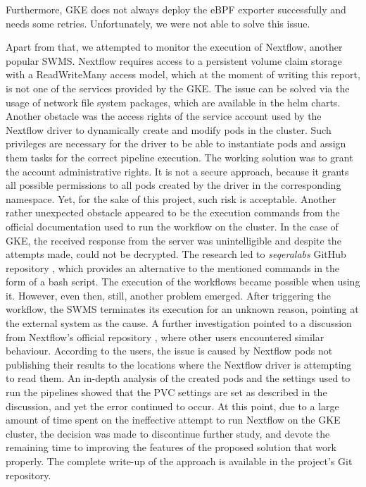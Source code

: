 \documentclass[a4paper,journal]{IEEEtran}
\begin{document}
Furthermore, GKE does not always deploy the eBPF exporter successfully and needs some retries. Unfortunately, we were not able to solve this issue.

Apart from that, we attempted to monitor the execution of Nextflow, another popular SWMS. Nextflow requires access to a persistent volume claim storage with a ReadWriteMany access model, which at the moment of writing this report, is not one of the services provided by the GKE. The issue can be solved via the usage of network file system packages, which are available in the helm charts. Another obstacle was the access rights of the service account used by the Nextflow driver to dynamically create and modify pods in the cluster. Such privileges are necessary for the driver to be able to instantiate pods and assign them tasks for the correct pipeline execution. The working solution was to grant the account administrative rights. It is not a secure approach, because it grants all possible permissions to all pods created by the driver in the corresponding namespace. Yet, for the sake of this project, such risk is acceptable. Another rather unexpected obstacle appeared to be the execution commands from the official documentation \cite{nextflowK8SDoku} used to run the workflow on the cluster. In the case of GKE, the received response from the server was unintelligible and despite the attempts made, could not be decrypted. The research led to \textit{seqeralabs} GitHub repository \cite{nextflowBestPractices}, which provides an alternative to the mentioned commands in the form of a bash script. The execution of the workflows became possible when using it. However, even then, still, another problem emerged. After triggering the workflow, the SWMS terminates its execution for an unknown reason, pointing at the external system as the cause. A further investigation pointed to a discussion from Nextflow's official repository \cite{nextflowGitDiscussion}, where other users encountered similar behaviour. According to the users, the issue is caused by Nextflow pods not publishing their results to the locations where the Nextflow driver is attempting to read them. An in-depth analysis of the created pods and the settings used to run the pipelines showed that the PVC settings are set as described in the discussion, and yet the error continued to occur. At this point, due to a large amount of time spent on the ineffective attempt to run Nextflow on the GKE cluster, the decision was made to discontinue further study, and devote the remaining time to improving the features of the proposed solution that work properly. The complete write-up of the approach is available in the project's Git repository.
\end{document}

